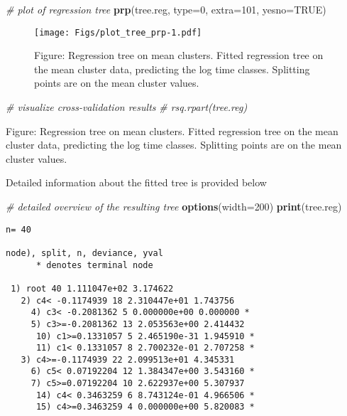\documentclass[]{article}
\newenvironment{Shaded}{\begin{snugshade}}{\end{snugshade}}
\newcommand{\KeywordTok}[1]{\textcolor[rgb]{0.13,0.29,0.53}{\textbf{{#1}}}}
\newcommand{\DataTypeTok}[1]{\textcolor[rgb]{0.13,0.29,0.53}{{#1}}}
\newcommand{\DecValTok}[1]{\textcolor[rgb]{0.00,0.00,0.81}{{#1}}}
\newcommand{\CommentTok}[1]{\textcolor[rgb]{0.56,0.35,0.01}{\textit{{#1}}}}
\newcommand{\OtherTok}[1]{\textcolor[rgb]{0.56,0.35,0.01}{{#1}}}
\newcommand{\NormalTok}[1]{{#1}}
\begin{document}
\begin{Shaded}
\begin{Highlighting}[]
\CommentTok{# plot of regression tree}
\KeywordTok{prp}\NormalTok{(tree.reg, }\DataTypeTok{type=}\DecValTok{0}\NormalTok{, }\DataTypeTok{extra=}\DecValTok{101}\NormalTok{, }\DataTypeTok{yesno=}\OtherTok{TRUE}\NormalTok{)}
\end{Highlighting}
\end{Shaded}

\begin{figure}[htbp]
\centering
\texttt{[image: Figs/plot\_tree\_prp-1.pdf]}
\caption{Figure: Regression tree on mean clusters. Fitted regression
tree on the mean cluster data, predicting the log time classes.
Splitting points are on the mean cluster values.}
\end{figure}

\begin{Shaded}
\begin{Highlighting}[]
\CommentTok{# visualize cross-validation results }
\CommentTok{# rsq.rpart(tree.reg) }
\end{Highlighting}
\end{Shaded}

Figure: Regression tree on mean clusters. Fitted regression tree on the
mean cluster data, predicting the log time classes. Splitting points are
on the mean cluster values.

Detailed information about the fitted tree is provided below \tiny

\begin{Shaded}
\begin{Highlighting}[]
\CommentTok{# detailed overview of the resulting tree}
\KeywordTok{options}\NormalTok{(}\DataTypeTok{width=}\DecValTok{200}\NormalTok{)}
\KeywordTok{print}\NormalTok{(tree.reg)}
\end{Highlighting}
\end{Shaded}

\begin{verbatim}
n= 40 

node), split, n, deviance, yval
      * denotes terminal node

 1) root 40 1.111047e+02 3.174622  
   2) c4< -0.1174939 18 2.310447e+01 1.743756  
     4) c3< -0.2081362 5 0.000000e+00 0.000000 *
     5) c3>=-0.2081362 13 2.053563e+00 2.414432  
      10) c1>=0.1331057 5 2.465190e-31 1.945910 *
      11) c1< 0.1331057 8 2.700232e-01 2.707258 *
   3) c4>=-0.1174939 22 2.099513e+01 4.345331  
     6) c5< 0.07192204 12 1.384347e+00 3.543160 *
     7) c5>=0.07192204 10 2.622937e+00 5.307937  
      14) c4< 0.3463259 6 8.743124e-01 4.966506 *
      15) c4>=0.3463259 4 0.000000e+00 5.820083 *
\end{verbatim}
\end{document}
